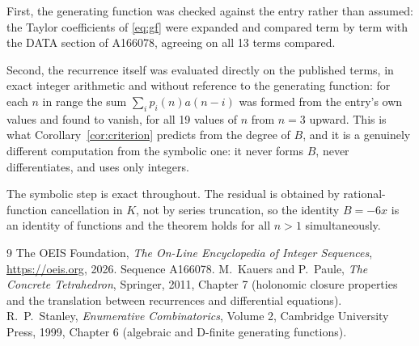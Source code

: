 \documentclass[11pt,a4paper]{article}
\theoremstyle{plain}
\theoremstyle{definition}
\begin{document}
First, the generating function was checked against the entry rather than assumed: the
Taylor coefficients of \eqref{eq:gf} were expanded and compared term by term with the DATA
section of A166078, agreeing on all 13 terms compared.

Second, the recurrence itself was evaluated directly on the published terms, in exact
integer arithmetic and without reference to the generating function: for each $n$ in range
the sum $\sum_{i}p_{i}(n)a(n-i)$ was formed from the entry's own values and found to
vanish, for all 19 values of $n$ from $n=3$ upward. This is what
Corollary~\ref{cor:criterion} predicts from the degree of $B$, and it is a genuinely
different computation from the symbolic one: it never forms $B$, never differentiates, and
uses only integers.

The symbolic step is exact throughout. The residual is obtained by rational-function
cancellation in $K$, not by series truncation, so the identity $B=- 6 x$ is an
identity of functions and the theorem holds for all $n>1$ simultaneously.

\begin{thebibliography}{9}
 The OEIS Foundation, \emph{The On-Line Encyclopedia of Integer Sequences},
\url{https://oeis.org}, 2026. Sequence A166078.
 M.~Kauers and P.~Paule, \emph{The Concrete Tetrahedron}, Springer, 2011,
Chapter 7 (holonomic closure properties and the translation between recurrences and
differential equations).
 R.~P.~Stanley, \emph{Enumerative Combinatorics}, Volume 2, Cambridge
University Press, 1999, Chapter 6 (algebraic and D-finite generating functions).
\end{thebibliography}
\end{document}
